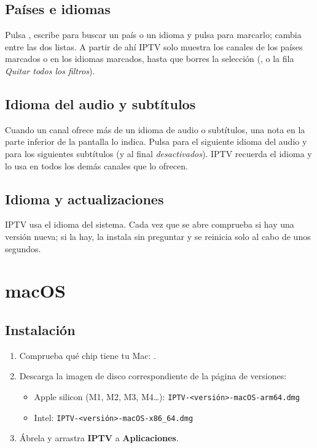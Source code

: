 \subsection{Países e idiomas}
Pulsa , escribe para buscar un país o un idioma y pulsa 
para marcarlo;  cambia entre las dos listas. A partir de ahí IPTV
solo muestra los canales de los países marcados o en los idiomas marcados,
hasta que borres la selección (, o la fila \emph{Quitar todos los
filtros}).

\subsection{Idioma del audio y subtítulos}
Cuando un canal ofrece más de un idioma de audio o subtítulos, una nota en la
parte inferior de la pantalla lo indica. Pulsa  para el siguiente
idioma del audio y  para los siguientes subtítulos (y al final
\emph{desactivados}). IPTV recuerda el idioma y lo usa en todos los demás
canales que lo ofrecen.

\subsection{Idioma y actualizaciones}
IPTV usa el idioma del sistema. Cada vez que se abre comprueba si hay una
versión nueva; si la hay, la instala sin preguntar y se reinicia solo al cabo
de unos segundos.

\section{macOS}

\subsection{Instalación}
\begin{enumerate}
  \item Comprueba qué chip tiene tu Mac: .
  \item Descarga la imagen de disco correspondiente de la página de
        versiones:
  \begin{itemize}
    \item Apple silicon (M1, M2, M3, M4\ldots):
          \texttt{IPTV-\textless versión\textgreater-macOS-arm64.dmg}
    \item Intel: \texttt{IPTV-\textless versión\textgreater-macOS-x86\_64.dmg}
  \end{itemize}
  \item Ábrela y arrastra \textbf{IPTV} a \textbf{Aplicaciones}.
\end{enumerate}

